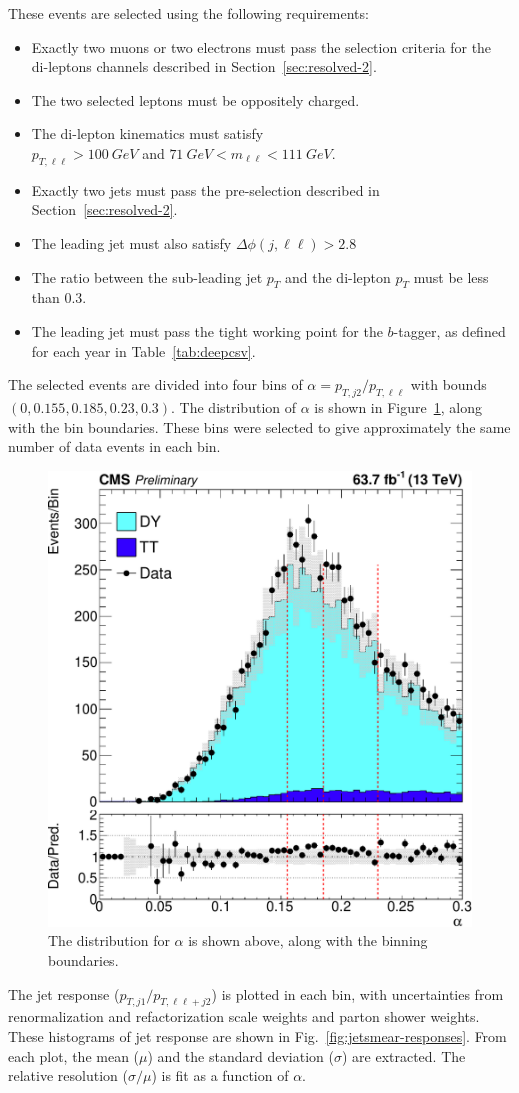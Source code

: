 These events are selected using the following requirements:

\begin{itemize}
\item Exactly two muons or two electrons must pass the selection criteria for the
  di-leptons channels described in Section~\ref{sec:resolved-2}.
\item The two selected leptons must be oppositely charged.
\item The di-lepton kinematics must satisfy \\ $p_{T,\ell\ell} > \SI{100}{GeV}$ and
  $\SI{71}{GeV} < m_{\ell\ell} < \SI{111}{GeV}$.
\item Exactly two jets must pass the pre-selection described in Section~\ref{sec:resolved-2}.
\item The leading jet must also satisfy $\Delta\phi(j, \ell\ell) > 2.8$
\item The ratio between the sub-leading jet $p_T$ and
  the di-lepton $p_T$ must be less than 0.3.
\item The leading jet must pass the tight working point for the $b$-tagger,
  as defined for each year in Table~\ref{tab:deepcsv}.
\end{itemize}

The selected events are divided into four bins of $\alpha = p_{T,j2}/p_{T, \ell\ell}$
with bounds $(0, 0.155, 0.185, 0.23, 0.3)$.
The distribution of $\alpha$ is shown in Figure~\ref{fig:alpha}, along with the bin boundaries.
These bins were selected to give approximately the same number of data events in each bin.
%
\begin{figure}
  \centering
  \includegraphics[width=0.6\linewidth]{figures/200303_alpha_lines_v2/smearplot_alpha.pdf}
  \caption[Distribution of $\alpha$ used for $b$ jet energy smearing]{
    The distribution for $\alpha$ is shown above, along with the binning boundaries.
  }
  \label{fig:alpha}
\end{figure}
%
The jet response ($p_{T, j1}/p_{T, \ell\ell + j2}$) is plotted in each bin,
with uncertainties from renormalization and refactorization scale weights
and parton shower weights.
These histograms of jet response are shown in Fig.~\ref{fig:jetsmear-responses}.
From each plot, the mean ($\mu$) and the standard deviation ($\sigma$) are extracted.
The relative resolution ($\sigma/\mu$) is fit as a function of $\alpha$.

